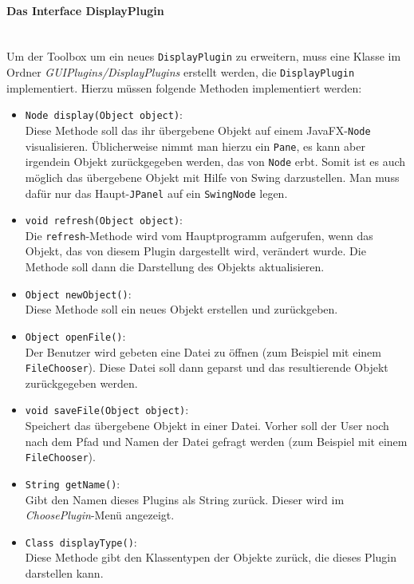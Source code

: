 \paragraph{Das Interface DisplayPlugin}\ \\
Um der Toolbox um ein neues \lstinline[columns=fixed]{DisplayPlugin} zu erweitern, muss eine Klasse im Ordner \textit{GUIPlugins/DisplayPlugins} erstellt werden, die \lstinline[columns=fixed]{DisplayPlugin} implementiert. Hierzu müssen folgende Methoden implementiert werden:
\begin{itemize}
	\item \lstinline[columns=fixed]{Node display(Object object)}:\\
	Diese Methode soll das ihr übergebene Objekt auf einem JavaFX-\lstinline[columns=fixed]{Node} visualisieren. Üblicherweise nimmt man hierzu ein \lstinline[columns=fixed]{Pane}, es kann aber irgendein Objekt zurückgegeben werden, das von \lstinline[columns=fixed]{Node} erbt. Somit ist es auch möglich das übergebene Objekt mit Hilfe von Swing darzustellen. Man muss dafür nur das Haupt-\lstinline[columns=fixed]{JPanel} auf ein \lstinline[columns=fixed]{SwingNode} legen.
	\item \lstinline[columns=fixed]{void refresh(Object object)}:\\
	Die \lstinline[columns=fixed]{refresh}-Methode wird vom Hauptprogramm aufgerufen, wenn das Objekt, das von diesem Plugin dargestellt wird, verändert wurde. Die Methode soll dann die Darstellung des Objekts aktualisieren.
	\item \lstinline[columns=fixed]{Object newObject()}:\\
	Diese Methode soll ein neues Objekt erstellen und zurückgeben.
	\item \lstinline[columns=fixed]{Object openFile()}:\\
	Der Benutzer wird gebeten eine Datei zu öffnen (zum Beispiel mit einem \lstinline[columns=fixed]{FileChooser}). Diese Datei soll dann geparst und das resultierende Objekt zurückgegeben werden.
	\item \lstinline[columns=fixed]{void saveFile(Object object)}:\\
	Speichert das übergebene Objekt in einer Datei. Vorher soll der User noch nach dem Pfad und Namen der Datei gefragt werden (zum Beispiel mit einem \lstinline[columns=fixed]{FileChooser}).
	\item \lstinline[columns=fixed]{String getName()}:\\
	Gibt den Namen dieses Plugins als String zurück. Dieser wird im \textit{ChoosePlugin}-Menü angezeigt.
	\item \lstinline[columns=fixed]{Class displayType()}:\\
	Diese Methode gibt den Klassentypen der Objekte zurück, die dieses Plugin darstellen kann.
\end{itemize}
